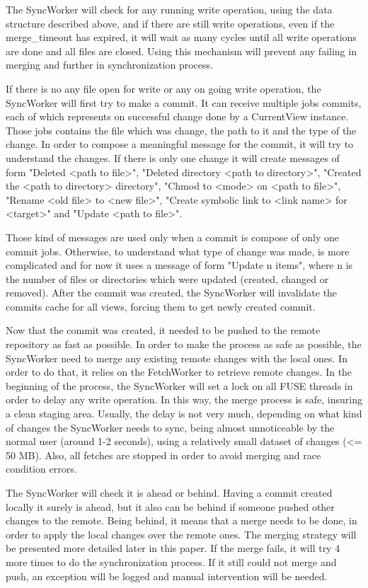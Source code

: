 The SyncWorker will check for any running write operation, using the data structure described above, and if there are still write operations, even if the merge\_timeout has expired, it will wait as many cycles until all write operations are done and all files are closed. Using this mechanism will prevent any failing in merging  and further in synchronization process.

If there is no any file open for write or any on going write operation, the SyncWorker will first try to make a commit. It can receive multiple jobs commits, each of which represents on successful change done by a CurrentView instance. Those jobs contains the file which was change, the path to it and the type of the change. In order to compose a meaningful message for the commit, it will try to understand the changes. If there is only one change it will create messages of form "Deleted <path to file>", "Deleted directory <path to directory>", "Created the <path to directory> directory", "Chmod to <mode> on <path to file>", "Rename <old file> to <new file>", "Create symbolic link to <link name> for <target>" and "Update <path to file>".

Those kind of messages are used only when a commit is compose of only one commit jobs. Otherwise, to understand what type of change was made, is more complicated and for now it uses a message of form "Update n items", where n is the number of files or directories which were updated (created, changed or removed).
After the commit was created, the SyncWorker will invalidate the commits cache for all views, forcing them to get newly created commit.

Now that the commit was created, it needed to be pushed to the remote repository as fast as possible. In order to make the process as safe as possible, the SyncWorker need to merge any existing remote changes with the local ones. In order to do that, it relies on the FetchWorker to retrieve remote changes. In the beginning of the process, the SyncWorker will set a lock on all FUSE threads in order to delay any write operation. In this way, the merge process is safe, insuring a clean staging area. Usually, the delay is not very much, depending on what kind of changes the SyncWorker needs to sync, being almost unnoticeable by the normal user (around 1-2 seconds), using a relatively small dataset of changes (<= 50 MB). Also, all fetches are stopped in order to avoid merging and race condition errors.

The SyncWorker will check it is ahead or behind. Having a commit created locally it surely is ahead, but it also can be behind if someone pushed other changes to the remote. Being behind, it means that a merge needs to be done, in order to apply the local changes over the remote ones. The merging strategy will be presented more detailed later in this paper. If the merge fails, it will try 4 more times to do the synchronization process. If it still could not merge and push, an exception will be logged and manual intervention will be needed.

